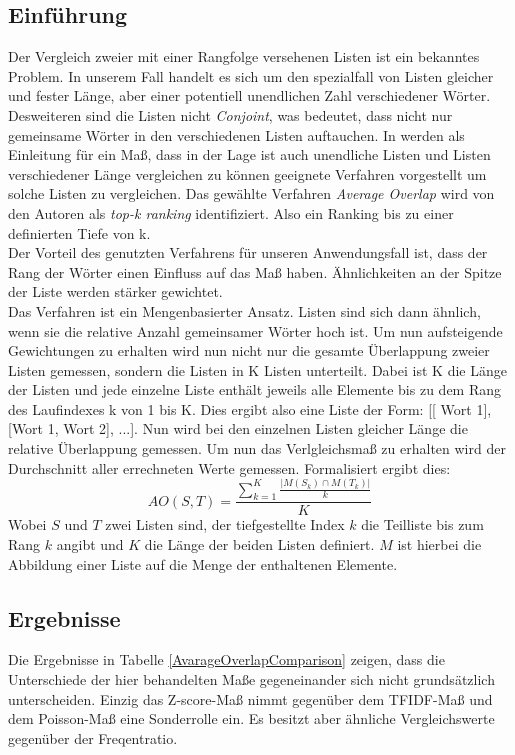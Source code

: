 \subsection{Einf\"uhrung}
Der Vergleich zweier mit einer Rangfolge versehenen Listen ist ein bekanntes Problem. In unserem Fall handelt es sich um den spezialfall von Listen gleicher und fester L\"ange, aber einer potentiell unendlichen Zahl verschiedener W\"orter. Desweiteren sind die Listen nicht \emph{Conjoint}, was bedeutet, dass nicht nur gemeinsame W\"orter in den verschiedenen Listen auftauchen. In \cite{webber2010similarity} werden als Einleitung f\"ur ein Ma\ss, dass in der Lage ist auch unendliche Listen und Listen verschiedener L\"ange vergleichen zu k\"onnen geeignete Verfahren vorgestellt um solche Listen zu vergleichen. Das gew\"ahlte Verfahren \emph{Average Overlap} wird von den Autoren als \emph{top-k ranking} identifiziert. Also ein Ranking bis zu einer definierten Tiefe von k.\\
Der Vorteil des genutzten Verfahrens f\"ur unseren Anwendungsfall ist, dass der Rang der W\"orter einen Einfluss auf das Maß haben. \"Ahnlichkeiten an der Spitze der Liste werden st\"arker gewichtet.\\
Das Verfahren ist ein Mengenbasierter Ansatz. Listen sind sich dann \"ahnlich, wenn sie die relative Anzahl gemeinsamer W\"orter hoch ist. Um nun aufsteigende Gewichtungen zu erhalten wird nun nicht nur die gesamte \"Uberlappung zweier Listen gemessen, sondern die Listen in K Listen unterteilt. Dabei ist K die L\"ange der Listen und jede einzelne Liste enthält jeweils alle Elemente bis zu dem Rang des Laufindexes k von 1 bis K. Dies ergibt also eine Liste der Form: [[ Wort 1],[Wort 1, Wort 2], ...]. Nun wird bei den einzelnen Listen gleicher L\"ange die relative \"Uberlappung gemessen. Um nun das Verlgleichsmaß  zu erhalten wird der Durchschnitt aller errechneten Werte gemessen. Formalisiert ergibt dies:
\begin{equation}
AO(S,T) = \frac{\sum_{k=1}^K\frac{| M(S_k) \cap M(T_k)|}{k}}{K}
\end{equation}
Wobei $S$ und $T$ zwei Listen sind, der tiefgestellte Index $k$ die Teilliste bis zum Rang $k$ angibt und $K$ die L\"ange der beiden Listen definiert. $M$ ist hierbei die Abbildung einer Liste auf die Menge der enthaltenen Elemente.\\
\subsection{Ergebnisse} \label{sec.quanitative_auswertung}
Die Ergebnisse in Tabelle \ref{AvarageOverlapComparison} zeigen, dass die Unterschiede der hier behandelten Maße gegeneinander sich nicht grundsätzlich unterscheiden. Einzig das Z-score-Maß nimmt gegenüber dem TFIDF-Maß und dem Poisson-Maß eine Sonderrolle ein. Es besitzt aber ähnliche Vergleichswerte gegenüber der Freqentratio. 

